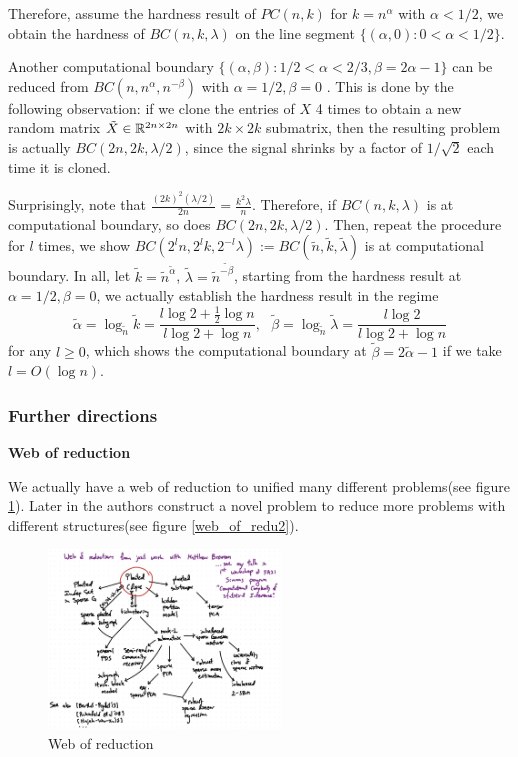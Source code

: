 Therefore, assume the hardness result of $PC(n,k)$ for $k=n^{\alpha}$ with $\alpha<1/2$, we obtain the hardness of $BC(n,k,\lambda)$ on the line segment $\{(\alpha,0):0<\alpha<1/2\}$.

\vspace{5pt}
Another computational boundary $\{(\alpha,\beta):1/2<\alpha<2/3,\beta=2\alpha-1\}$ can be reduced from $BC(n,n^\alpha,n^{-\beta})$ with $\alpha=1/2,\beta=0$ . 
This is done by the following observation: if we clone the entries of $X$ 4 times to obtain a new random matrix $\tilde{X}\in\mathbb{R}^{2n\times 2n}$ with $2k\times 2k$ submatrix, then the resulting problem is actually $BC(2n,2k,\lambda/2)$, since the signal shrinks by a factor of $1/\sqrt{2}$ each time it is cloned. 

Surprisingly, note that $\frac{(2k)^2(\lambda/2)}{2 n} = \frac{k^2\lambda}{n}$. Therefore, if $BC(n,k,\lambda)$ is at computational boundary, so does $BC(2n,2k,\lambda/2)$. Then, repeat the procedure for $l$ times, we show $BC(2^ln,2^lk,2^{-l}\lambda):=BC(\tilde{n},\tilde{k},\tilde{\lambda})$ is at computational boundary. In all, let $\tilde{k}=\tilde{n}^{\tilde{\alpha}}$, $\tilde{\lambda}=\tilde{n}^{\tilde{-\beta}}$, starting from the hardness result at $\alpha=1/2,\beta=0$, 
we actually establish the hardness result in the regime
$$\tilde{\alpha} = \log_{\tilde{n}}\tilde{k}=\frac{l\log 2 + \frac{1}{2}\log n}{l\log 2 + \log n},~~~\tilde{\beta}=\log_{\tilde{n}}\tilde{\lambda}=\frac{l\log 2}{l\log 2 + \log n}$$
for any $l\ge 0$, which shows the computational boundary at $\tilde{\beta}=2\tilde{\alpha} -1$ if we take $l=O(\log n)$.
\vspace{10pt}

\subsubsection{Further directions}
\textbf{Web of reduction}

We actually have a web of reduction to unified many different problems(see figure \ref{web_of_redu}).
Later in \cite{brennan2020reducibility} the authors construct a novel problem to reduce more problems with different structures(see figure \ref{web_of_redu2}).

\begin{figure}
    \centering
    \includegraphics[width=0.55\textwidth]{web_of_redu.jpg}
    \caption{Web of reduction }
    \label{web_of_redu}
\end{figure}

